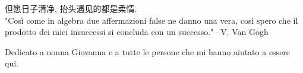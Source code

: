 
\cleardoublepage
{}
\thispagestyle{empty}

\vspace*{3cm}

\begin{center}
    但愿日子清净, 抬头遇见的都是柔情.\\ \medskip
    "Così come in algebra due affermazioni false ne danno una vera, così spero che il prodotto dei miei insuccessi si concluda con un successo." \medskip
    --V. Van Gogh
\end{center}

\medskip

\begin{center}
Dedicato a nonna Giovanna e a tutte le persone che mi hanno aiutato a essere qui.
\end{center}

